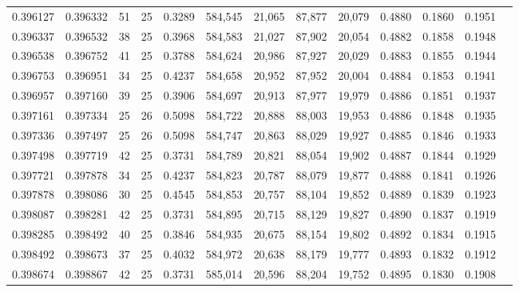 \begin{tabular}{rrrrrrrrrrrrr}
0.396127 & 0.396332 &    51 &  25 &                                     0.3289 & 584,545 &  21,065 &  87,877 &  20,079 & 0.4880 & 0.1860 & 0.1951 \\
0.396337 & 0.396532 &    38 &  25 &                                     0.3968 & 584,583 &  21,027 &  87,902 &  20,054 & 0.4882 & 0.1858 & 0.1948 \\
0.396538 & 0.396752 &    41 &  25 &                                     0.3788 & 584,624 &  20,986 &  87,927 &  20,029 & 0.4883 & 0.1855 & 0.1944 \\
0.396753 & 0.396951 &    34 &  25 &                                     0.4237 & 584,658 &  20,952 &  87,952 &  20,004 & 0.4884 & 0.1853 & 0.1941 \\
0.396957 & 0.397160 &    39 &  25 &                                     0.3906 & 584,697 &  20,913 &  87,977 &  19,979 & 0.4886 & 0.1851 & 0.1937 \\
0.397161 & 0.397334 &    25 &  26 &                                     0.5098 & 584,722 &  20,888 &  88,003 &  19,953 & 0.4886 & 0.1848 & 0.1935 \\
0.397336 & 0.397497 &    25 &  26 &                                     0.5098 & 584,747 &  20,863 &  88,029 &  19,927 & 0.4885 & 0.1846 & 0.1933 \\
0.397498 & 0.397719 &    42 &  25 &                                     0.3731 & 584,789 &  20,821 &  88,054 &  19,902 & 0.4887 & 0.1844 & 0.1929 \\
0.397721 & 0.397878 &    34 &  25 &                                     0.4237 & 584,823 &  20,787 &  88,079 &  19,877 & 0.4888 & 0.1841 & 0.1926 \\
0.397878 & 0.398086 &    30 &  25 &                                     0.4545 & 584,853 &  20,757 &  88,104 &  19,852 & 0.4889 & 0.1839 & 0.1923 \\
0.398087 & 0.398281 &    42 &  25 &                                     0.3731 & 584,895 &  20,715 &  88,129 &  19,827 & 0.4890 & 0.1837 & 0.1919 \\
0.398285 & 0.398492 &    40 &  25 &                                     0.3846 & 584,935 &  20,675 &  88,154 &  19,802 & 0.4892 & 0.1834 & 0.1915 \\
0.398492 & 0.398673 &    37 &  25 &                                     0.4032 & 584,972 &  20,638 &  88,179 &  19,777 & 0.4893 & 0.1832 & 0.1912 \\
0.398674 & 0.398867 &    42 &  25 &                                     0.3731 & 585,014 &  20,596 &  88,204 &  19,752 & 0.4895 & 0.1830 & 0.1908 \\

\end{tabular}
